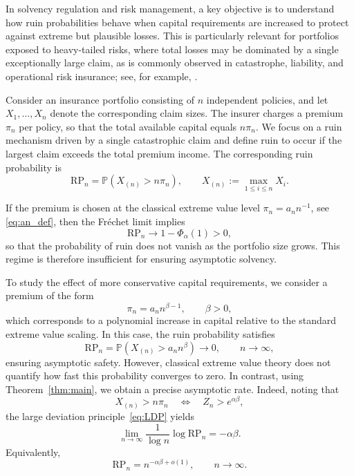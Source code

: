 \documentclass[11pt,reqno]{amsart}
\theoremstyle{definition}
\theoremstyle{remark}
\numberwithin{equation}{section}
\begin{document}
In solvency regulation and risk management, a key objective is to understand how ruin probabilities behave when capital requirements are increased to protect against extreme but plausible losses. This is particularly relevant for portfolios
exposed to heavy-tailed risks, where total losses may be dominated by a single
exceptionally large claim, as is commonly observed in catastrophe, liability,
and operational risk insurance; see, for example, \cite{Embrechts,mcneil}.

Consider an insurance portfolio consisting of $n$ independent policies, and let
$X_1, \ldots, X_n$ denote the corresponding claim sizes. The insurer charges a
premium $\pi_n$ per policy, so that the total available capital equals $n\pi_n$.
We focus on a ruin mechanism driven by a single catastrophic claim and define
ruin to occur if the largest claim exceeds the total premium income. The
corresponding ruin probability is
\[
\mathrm{RP}_n
=
\mathbb{P}(X_{(n)} > n\pi_n),
\qquad
X_{(n)} := \max_{1 \le i \le n} X_i .
\]

If the premium is chosen at the classical extreme value level
$\pi_n = a_n n^{-1}$, see \eqref{eq:an_def}, then the Fr\'echet limit implies
\[
\mathrm{RP}_n \longrightarrow 1-\Phi_\alpha(1) > 0,
\]
so that the probability of ruin does not vanish as the portfolio size grows.
This regime is therefore insufficient for ensuring asymptotic solvency.

To study the effect of more conservative capital requirements, we consider a
premium of the form
\[
\pi_n = a_n n^{\beta-1},
\qquad \beta > 0,
\]
which corresponds to a polynomial increase in capital relative to the standard
extreme value scaling. In this case, the ruin probability satisfies
\[
\mathrm{RP}_n
=
\mathbb{P}(X_{(n)} > a_n n^\beta)
\longrightarrow 0,
\qquad n \to \infty,
\]
ensuring asymptotic safety. However, classical extreme value theory does not quantify how fast this
probability converges to zero. In contrast, using Theorem~\ref{thm:main}, we obtain a precise
asymptotic rate. Indeed, noting that
\[
X_{(n)} > n\pi_n
\quad\Longleftrightarrow\quad
Z_n > e^{\alpha\beta},
\]
the large deviation principle~\eqref{eq:LDP} yields
\begin{equation}\label{eq:ruin_LDP}
\lim_{n\to\infty}
\frac{1}{\log n}
\log \mathrm{RP}_n
=
- \alpha \beta.
\end{equation}
Equivalently,
\begin{equation}\label{eq:ruin_poly}
\mathrm{RP}_n
=
n^{-\alpha\beta + o(1)},
\qquad n\to\infty.
\end{equation}
\end{document}
